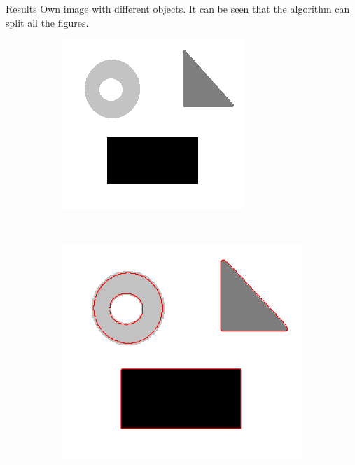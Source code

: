 \documentclass[11pt]{beamer}
\begin{document}
\begin{frame}{Results}
Own image with different objects.  It can be seen that the algorithm can split all the figures.

\begin{figure}
    \centering
    \begin{subfigure}[b]{0.45\textwidth}
        \includegraphics[width=\textwidth]{Tres_formas}

    \end{subfigure}
    ~ 
        \begin{subfigure}[b]{0.45\textwidth}
        \includegraphics[width=\textwidth]{Tres_formas_segmented}

    \end{subfigure}

\end{figure}
\href{run:videos/Tres_formas.avi}{\color{red}{Video of the segmentation}}
\end{frame}
\end{document}
